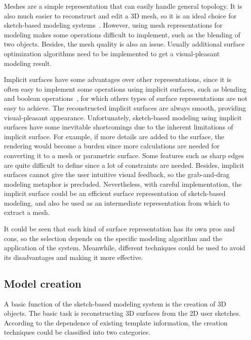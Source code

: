 Meshes are a simple representation that can easily handle general topology. It is also much easier to reconstruct and edit a 3D mesh, so it is an ideal choice for sketch-based modeling systems~\cite{IMT99,IH03,NSAC05,KPG05,KH06,NISA07,ASN07,ZNA07,KSV09}. However, using mesh representations for modeling makes some operations difficult to implement, such as the blending of two objects. Besides, the mesh quality is also an issue. Usually additional surface optimization algorithms need to be implemented to get a visual-pleasant modeling result.

Implicit surfaces have some advantages over other representations, since it is often easy to implement some operations using implicit surfaces, such as blending and boolean operations~\cite{AGB04,AJ03,KHR02}, for which others types of surface representations are not easy to achieve. The reconstructed implicit surfaces are always smooth, providing visual-pleasant appearance. Unfortunately, sketch-based modeling using implicit surfaces have some inevitable shortcomings due to the inherent limitations of implicit surface. For example, if more details are added to the surface, the rendering would become a burden since more calculations are needed for converting it to a mesh or parametric surface. Some features such as sharp edges are quite difficult to define since a lot of constraints are needed. Besides, implicit surfaces cannot give the user intuitive visual feedback, so the grab-and-drag modeling metaphor is precluded. Nevertheless, with careful implementation, the implicit surface could be an efficient surface representation of sketch-based modeling, and also be used as an intermediate representation from which to extract a mesh.

It could be seen that each kind of surface representation has its own pros and cons, so the selection depends on the specific modeling algorithm and the application of the system. Meanwhile, different techniques could be used to avoid its disadvantages and making it more effective.

\subsection{Model creation}\label{ch2:sec:sbim:creation}

A basic function of the sketch-based modeling system is the creation of 3D objects. The basic task is reconstructing 3D surfaces from the 2D user sketches. According to the dependence of existing template information, the creation techniques could be classified into two categories.

